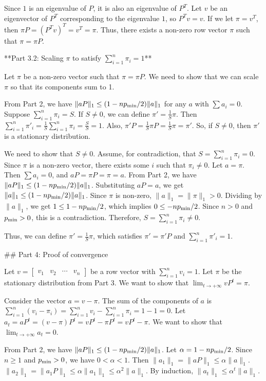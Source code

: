 \begin{enumerate}
\begin{shaded}
Since $1$ is an eigenvalue of $P$, it is also an eigenvalue of $P^T$. Let $v$ be an eigenvector of $P^T$ corresponding to the eigenvalue $1$, so $P^T v = v$. If we let $\pi = v^T$, then $\pi P = (P^T v)^T = v^T = \pi$. Thus, there exists a non-zero row vector $\pi$ such that $\pi = \pi P$.

**Part 3.2: Scaling $\pi$ to satisfy $\sum_{i=1}^{n}\pi_i = 1$**

Let $\pi$ be a non-zero vector such that $\pi = \pi P$. We need to show that we can scale $\pi$ so that its components sum to 1.

From Part 2, we have $\|aP\|_1 \le (1 - np_{\textrm{min}} /2)\|a\|_1$ for any $a$ with $\sum a_i = 0$.
Suppose $\sum_{i=1}^n \pi_i = S$. If $S \neq 0$, we can define $\pi' = \frac{1}{S} \pi$. Then $\sum_{i=1}^n \pi'_i = \frac{1}{S} \sum_{i=1}^n \pi_i = \frac{S}{S} = 1$.
Also, $\pi' P = \frac{1}{S} \pi P = \frac{1}{S} \pi = \pi'$.
So, if $S \neq 0$, then $\pi'$ is a stationary distribution.

We need to show that $S \neq 0$. Assume, for contradiction, that $S = \sum_{i=1}^n \pi_i = 0$. Since $\pi$ is a non-zero vector, there exists some $i$ such that $\pi_i \neq 0$. Let $a = \pi$. Then $\sum a_i = 0$, and $aP = \pi P = \pi = a$.
From Part 2, we have $\|aP\|_1 \le (1 - np_{\textrm{min}} /2)\|a\|_1$. Substituting $aP = a$, we get $\|a\|_1 \le (1 - np_{\textrm{min}} /2)\|a\|_1$.
Since $\pi$ is non-zero, $\|a\|_1 = \|\pi\|_1 > 0$. Dividing by $\|a\|_1$, we get $1 \le 1 - np_{\textrm{min}} /2$, which implies $0 \le -np_{\textrm{min}} /2$. Since $n > 0$ and $p_{\textrm{min}} > 0$, this is a contradiction.
Therefore, $S = \sum_{i=1}^n \pi_i \neq 0$.

Thus, we can define $\pi' = \frac{1}{S} \pi$, which satisfies $\pi' = \pi' P$ and $\sum_{i=1}^n \pi'_i = 1$.

## Part 4: Proof of convergence

Let $v = \begin{bmatrix}v_1 & v_2 & \cdots & v_n\end{bmatrix}$ be a row vector with $\sum_{i=1}^nv_i = 1$. Let $\pi$ be the stationary distribution from Part 3. We want to show that $\lim_{t\to+\infty}vP^t = \pi$.

Consider the vector $a = v - \pi$. The sum of the components of $a$ is $\sum_{i=1}^n (v_i - \pi_i) = \sum_{i=1}^n v_i - \sum_{i=1}^n \pi_i = 1 - 1 = 0$.
Let $a_t = a P^t = (v - \pi) P^t = v P^t - \pi P^t = v P^t - \pi$.
We want to show that $\lim_{t\to+\infty} a_t = 0$.

From Part 2, we have $\|aP\|_1 \le (1 - np_{\textrm{min}} /2)\|a\|_1$. Let $\alpha = 1 - np_{\textrm{min}} /2$. Since $n \ge 1$ and $p_{\textrm{min}} > 0$, we have $0 < \alpha < 1$.
Then $\|a_1\|_1 = \|aP\|_1 \le \alpha \|a\|_1$.
$\|a_2\|_1 = \|a_1 P\|_1 \le \alpha \|a_1\|_1 \le \alpha^2 \|a\|_1$.
By induction, $\|a_t\|_1 \le \alpha^t \|a\|_1$.


\end{shaded}
\end{enumerate}
